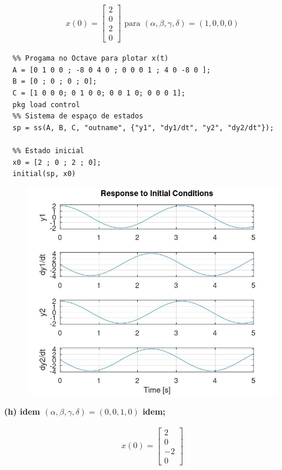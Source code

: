 \documentclass[11pt]{article}
\begin{document}
\begin{align*}
  x(0) =
  \begin{bmatrix}
    2 \\
    0\\
    2\\
    0
  \end{bmatrix}
  \text{ para } (\alpha, \beta, \gamma, \delta) = (1, 0, 0, 0)
\end{align*}

\begin{verbatim}
  %% Progama no Octave para plotar x(t)
  A = [0 1 0 0 ; -8 0 4 0 ; 0 0 0 1 ; 4 0 -8 0 ];
  B = [0 ; 0 ; 0 ; 0];
  C = [1 0 0 0; 0 1 0 0; 0 0 1 0; 0 0 0 1];
  pkg load control
  %% Sistema de espaço de estados
  sp = ss(A, B, C, "outname", {"y1", "dy1/dt", "y2", "dy2/dt"});

  %% Estado inicial
  x0 = [2 ; 0 ; 2 ; 0];
  initial(sp, x0)
\end{verbatim}

\begin{center}
  \begin{figure}[h]
    \centering
    \includegraphics[scale=0.5]{plot2g.jpg}
  \end{figure}
\end{center}

\newpage

\textbf{(h) idem $(\alpha, \beta, \gamma, \delta) = (0, 0, 1, 0)$ idem;}

\begin{align*}
  x(0) =
  \begin{bmatrix}
    2 \\
    0\\
    -2\\
    0
  \end{bmatrix}
\end{align*}
\end{document}
